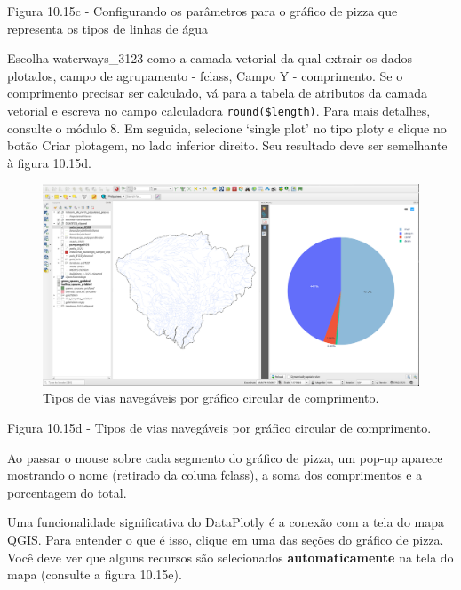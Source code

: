 \documentclass[
]{krantz}
\begin{document}
Figura 10.15c - Configurando os parâmetros para o gráfico de pizza que representa os tipos de linhas de água

Escolha waterways\_3123 como a camada vetorial da qual extrair os dados plotados, campo de agrupamento - fclass, Campo Y - comprimento. Se o comprimento precisar ser calculado, vá para a tabela de atributos da camada vetorial e escreva no campo calculadora \texttt{round(\$length)}. Para mais detalhes, consulte o módulo 8. Em seguida, selecione `single plot' no tipo ploty e clique no botão Criar plotagem, no lado inferior direito. Seu resultado deve ser semelhante à figura 10.15d.

\begin{figure}
\centering
\includegraphics{media/modulo10/fig1015_d.png}
\caption{Tipos de vias navegáveis \hspace{0pt}\hspace{0pt}por gráfico circular de comprimento.}
\end{figure}

Figura 10.15d - Tipos de vias navegáveis \hspace{0pt}\hspace{0pt}por gráfico circular de comprimento.

Ao passar o mouse sobre cada segmento do gráfico de pizza, um pop-up aparece mostrando o nome (retirado da coluna fclass), a soma dos comprimentos e a porcentagem do total.

Uma funcionalidade significativa do DataPlotly é a conexão com a tela do mapa QGIS. Para entender o que é isso, clique em uma das seções do gráfico de pizza. Você deve ver que alguns recursos são selecionados \textbf{automaticamente} na tela do mapa (consulte a figura 10.15e).
\end{document}
